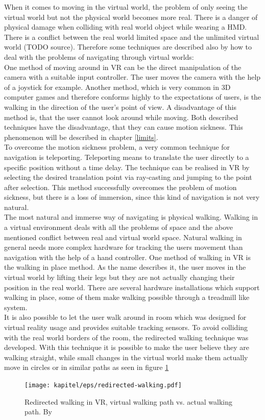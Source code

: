 When it comes to moving in the virtual world, the problem of only seeing the virtual world but not the physical world becomes more real. There is a danger of physical damage when colliding with real world object while wearing a HMD. There is a conflict between the real world limited space and the unlimited virtual world (TODO source). Therefore some techniques are described also by \cite{Dorner.2013} how to deal with the problems of navigating through virtual worlds:\\
One method of moving around in VR can be the direct manipulation of the camera with a suitable input controller. The user moves the camera with the help of a joystick for example. Another method, which is very common in 3D computer games and therefore conforms highly to the expectations of users, is the walking in the direction of the user's point of view. A disadvantage of this method is, that the user cannot look around while moving. Both described techniques have the disadvantage, that they can cause motion sickness. This phenomenon will be described in chapter \ref{limits}.\\
To overcome the motion sickness problem, a very common technique for navigation is teleporting. Teleporting means to translate the user directly to a specific position without a time delay. The technique can be realised in VR by selecting the desired translation point via ray-casting and jumping to the point after selection. This method successfully overcomes the problem of motion sickness, but there is a loss of immersion, since this kind of navigation is not very natural.  \cite{Bozgeyikli.2016}\\
The most natural and immerse way of navigating is physical walking. Walking in a virtual environment deals with all the problems of space and the above mentioned conflict between real and virtual world space. Natural walking in general needs more complex hardware for tracking the users movement than navigation with the help of a hand controller. One method of walking in VR is the walking in place method. As the name describes it, the user moves in the virtual world by lifting their legs but they are not actually changing their position in the real world. There are several hardware installations which support walking in place, some of them make walking possible through a treadmill like system.\\
It is also possible to let the user walk around in room which was designed for virtual reality usage and provides suitable tracking sensors. To avoid colliding with the real world borders of the room, the redirected walking technique was developed. With this technique it is possible to make the user believe they are walking straight, while small changes in the virtual world make them actually move in circles or in similar paths as seen in figure \ref{fig:walking}
\begin{figure}[h!]
  \texttt{[image: kapitel/eps/redirected-walking.pdf]}
  \centering
  \caption{Redirected walking in VR, virtual walking path vs. actual walking path. By \cite{LS18}}
  \label{fig:walking}
\end{figure}

